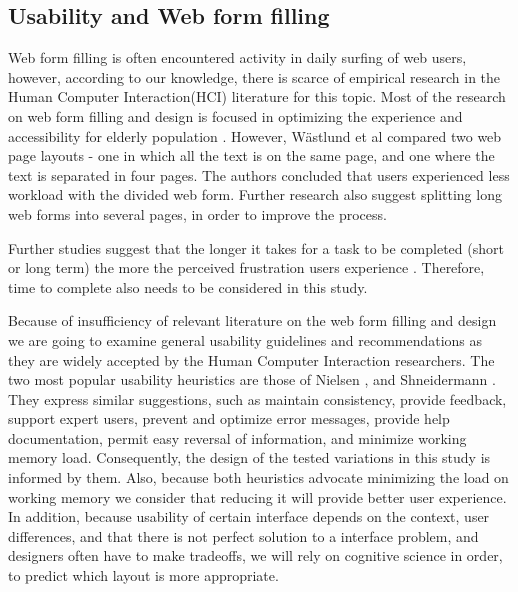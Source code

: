 \documentclass[../main/Feedback.tex]{subfiles}
\begin{document}
\subsection{Usability and Web form filling}	
Web form filling is often encountered activity in daily surfing of web users, however, according to our knowledge, there is scarce of empirical research in the Human Computer Interaction(HCI) literature for this topic.
Most of the research on web form filling and design is focused in optimizing the experience and accessibility for elderly population \cite{sayago2012selective,chadwick2003web,lines2006online,sayago2007some}.
However, Wästlund et al \cite{Wastlund20081229} compared two web page layouts - one in which all the text is on the same page, and one where the text is separated in four pages.
The authors concluded that users experienced less workload with the divided web form.
Further research \cite{jarrett2009forms,wroblewski2008web} also suggest splitting long web forms into several pages, in order to improve the process.

Further studies suggest that the longer it takes for a task to be completed (short or long term) the more the perceived frustration users experience \cite{mendoza2005usability,bessiere2004social}.
Therefore, time to complete also needs to be considered in this study.


Because of insufficiency of relevant literature on the web form filling and design we are going to examine general usability guidelines and recommendations as they are widely accepted by the Human Computer Interaction researchers.
The two most popular usability heuristics are those of Nielsen \cite{nielsen1990heuristic}, and Shneidermann \cite{shneiderman1992designing}.
They express similar suggestions, such as maintain consistency, provide feedback, support expert users, prevent and optimize error messages, provide help documentation, permit easy reversal of information, and minimize working memory load.
Consequently, the design of the tested variations in this study is informed by them.
Also, because both heuristics advocate minimizing the load on working memory we consider that reducing it will provide better user experience.
In addition, because usability of certain interface depends on the context, user differences, and that there is not perfect solution to a interface problem, and designers often have to make tradeoffs\cite{norman1986user}, we will rely on cognitive science in order, to predict which layout is more appropriate.
\end{document}

